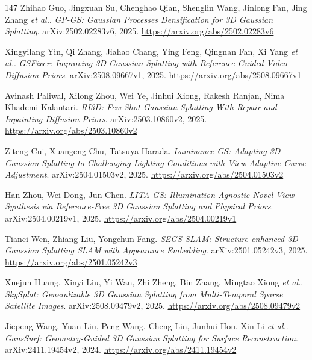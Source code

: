 \documentclass[11pt,a4paper]{article}
\begin{document}
\begin{thebibliography}{147}
Zhihao Guo, Jingxuan Su, Chenghao Qian, Shenglin Wang, Jinlong Fan, Jing Zhang \emph{et al.}.
\newblock \emph{GP-GS: Gaussian Processes Densification for 3D Gaussian Splatting}.
\newblock arXiv:2502.02283v6, 2025.
\newblock \url{https://arxiv.org/abs/2502.02283v6}

Xingyilang Yin, Qi Zhang, Jiahao Chang, Ying Feng, Qingnan Fan, Xi Yang \emph{et al.}.
\newblock \emph{GSFixer: Improving 3D Gaussian Splatting with Reference-Guided Video Diffusion Priors}.
\newblock arXiv:2508.09667v1, 2025.
\newblock \url{https://arxiv.org/abs/2508.09667v1}

Avinash Paliwal, Xilong Zhou, Wei Ye, Jinhui Xiong, Rakesh Ranjan, Nima Khademi Kalantari.
\newblock \emph{RI3D: Few-Shot Gaussian Splatting With Repair and Inpainting Diffusion Priors}.
\newblock arXiv:2503.10860v2, 2025.
\newblock \url{https://arxiv.org/abs/2503.10860v2}

Ziteng Cui, Xuangeng Chu, Tatsuya Harada.
\newblock \emph{Luminance-GS: Adapting 3D Gaussian Splatting to Challenging Lighting Conditions with View-Adaptive Curve Adjustment}.
\newblock arXiv:2504.01503v2, 2025.
\newblock \url{https://arxiv.org/abs/2504.01503v2}

Han Zhou, Wei Dong, Jun Chen.
\newblock \emph{LITA-GS: Illumination-Agnostic Novel View Synthesis via Reference-Free 3D Gaussian Splatting and Physical Priors}.
\newblock arXiv:2504.00219v1, 2025.
\newblock \url{https://arxiv.org/abs/2504.00219v1}

Tianci Wen, Zhiang Liu, Yongchun Fang.
\newblock \emph{SEGS-SLAM: Structure-enhanced 3D Gaussian Splatting SLAM with Appearance Embedding}.
\newblock arXiv:2501.05242v3, 2025.
\newblock \url{https://arxiv.org/abs/2501.05242v3}

Xuejun Huang, Xinyi Liu, Yi Wan, Zhi Zheng, Bin Zhang, Mingtao Xiong \emph{et al.}.
\newblock \emph{SkySplat: Generalizable 3D Gaussian Splatting from Multi-Temporal Sparse Satellite Images}.
\newblock arXiv:2508.09479v2, 2025.
\newblock \url{https://arxiv.org/abs/2508.09479v2}

Jiepeng Wang, Yuan Liu, Peng Wang, Cheng Lin, Junhui Hou, Xin Li \emph{et al.}.
\newblock \emph{GausSurf: Geometry-Guided 3D Gaussian Splatting for Surface Reconstruction}.
\newblock arXiv:2411.19454v2, 2024.
\newblock \url{https://arxiv.org/abs/2411.19454v2}


\end{thebibliography}
\end{document}
